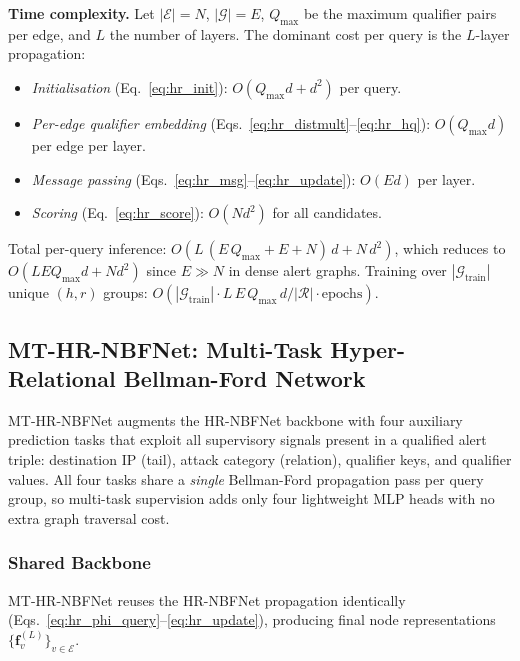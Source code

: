 \documentclass[10pt,journal,compsoc]{IEEEtran}
\begin{document}
\noindent\textbf{Time complexity.}
Let $|\mathcal{E}|{=}N$, $|\mathcal{G}|{=}E$,
$Q_{\max}$ be the maximum qualifier pairs per edge, and
$L$ the number of layers.
The dominant cost per query is the $L$-layer propagation:
\begin{itemize}
  \item \emph{Initialisation} (Eq.~\ref{eq:hr_init}):
    $O(Q_{\max} d + d^2)$ per query.
  \item \emph{Per-edge qualifier embedding}
    (Eqs.~\ref{eq:hr_distmult}--\ref{eq:hr_hq}):
    $O(Q_{\max} d)$ per edge per layer.
  \item \emph{Message passing}
    (Eqs.~\ref{eq:hr_msg}--\ref{eq:hr_update}):
    $O(E d)$ per layer.
  \item \emph{Scoring} (Eq.~\ref{eq:hr_score}):
    $O(N d^2)$ for all candidates.
\end{itemize}
Total per-query inference:
$O\!\left(L\,(E\,Q_{\max} + E + N)\,d
  + N\,d^2\right)$,
which reduces to $O(L E Q_{\max} d + N d^2)$
since $E \gg N$ in dense alert graphs.
Training over $|\mathcal{G}_{\mathrm{train}}|$ unique
$(h,r)$ groups:
$O\!\left(|\mathcal{G}_{\mathrm{train}}|\cdot
  L\,E\,Q_{\max}\,d / |\mathcal{R}|
  \cdot \mathrm{epochs}\right)$.

\subsection{MT-HR-NBFNet: Multi-Task Hyper-Relational
            Bellman-Ford Network}
\label{ssec:mthrnbfnet}

MT-HR-NBFNet augments the HR-NBFNet backbone with four
auxiliary prediction tasks that exploit all supervisory
signals present in a qualified alert triple: destination
IP (tail), attack category (relation), qualifier keys,
and qualifier values.
All four tasks share a \emph{single} Bellman-Ford
propagation pass per query group, so multi-task supervision
adds only four lightweight MLP heads with no extra graph
traversal cost.

\subsubsection{Shared Backbone}
MT-HR-NBFNet reuses the HR-NBFNet propagation identically
(Eqs.~\ref{eq:hr_phi_query}--\ref{eq:hr_update}),
producing final node representations
$\{\mathbf{f}_v^{(L)}\}_{v \in \mathcal{E}}$.
\end{document}
